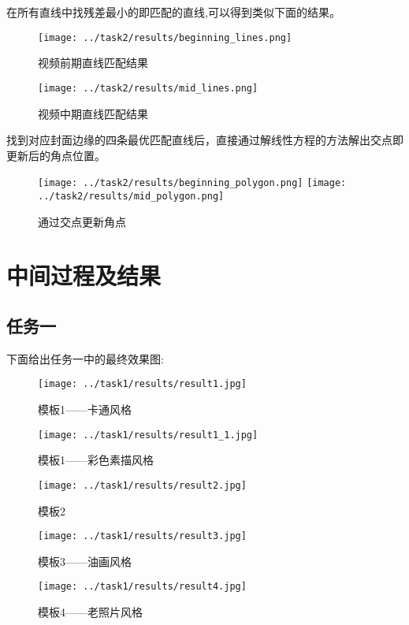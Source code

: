 \documentclass[UTF8]{ctexart}
\begin{document}
在所有直线中找残差最小的即匹配的直线,可以得到类似下面的结果。
\begin{figure}[H]
    \centering
    \texttt{[image: ../task2/results/beginning\_lines.png]}
    \caption{视频前期直线匹配结果}
\end{figure}

\begin{figure}[H]
    \centering
    \texttt{[image: ../task2/results/mid\_lines.png]}
    \caption{视频中期直线匹配结果}
\end{figure}
找到对应封面边缘的四条最优匹配直线后，直接通过解线性方程的方法解出交点即更新后的角点位置。
\begin{figure}[H]
    \centering
    \texttt{[image: ../task2/results/beginning\_polygon.png]}
    \texttt{[image: ../task2/results/mid\_polygon.png]}
    \caption{通过交点更新角点}
\end{figure}
\section{中间过程及结果}
\subsection{任务一}
下面给出任务一中的最终效果图:
\begin{figure}[H]
    \centering
    \texttt{[image: ../task1/results/result1.jpg]}
    \caption{模板1——卡通风格}
\end{figure}

\begin{figure}[H]
    \centering
    \texttt{[image: ../task1/results/result1\_1.jpg]}
    \caption{模板1——彩色素描风格}
\end{figure}

\begin{figure}[H]
    \centering
    \texttt{[image: ../task1/results/result2.jpg]}
    \caption{模板2}
\end{figure}

\begin{figure}[H]
    \centering
    \texttt{[image: ../task1/results/result3.jpg]}
    \caption{模板3——油画风格}
\end{figure}

\begin{figure}[H]
    \centering
    \texttt{[image: ../task1/results/result4.jpg]}
    \caption{模板4——老照片风格}
\end{figure}
\end{document}
